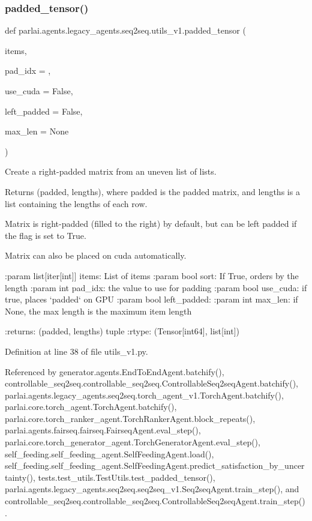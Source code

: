 \subsubsection{\texorpdfstring{padded\+\_\+tensor()}{padded\_tensor()}}
{\footnotesize\ttfamily def parlai.\+agents.\+legacy\+\_\+agents.\+seq2seq.\+utils\+\_\+v1.\+padded\+\_\+tensor (\begin{DoxyParamCaption}\item[{}]{items,  }\item[{}]{pad\+\_\+idx = {},  }\item[{}]{use\+\_\+cuda = {\ttfamily False},  }\item[{}]{left\+\_\+padded = {\ttfamily False},  }\item[{}]{max\+\_\+len = {\ttfamily None} }\end{DoxyParamCaption})}

\begin{DoxyVerb}Create a right-padded matrix from an uneven list of lists.

Returns (padded, lengths), where padded is the padded matrix, and lengths
is a list containing the lengths of each row.

Matrix is right-padded (filled to the right) by default, but can be
left padded if the flag is set to True.

Matrix can also be placed on cuda automatically.

:param list[iter[int]] items: List of items
:param bool sort: If True, orders by the length
:param int pad_idx: the value to use for padding
:param bool use_cuda: if true, places `padded` on GPU
:param bool left_padded:
:param int max_len: if None, the max length is the maximum item length

:returns: (padded, lengths) tuple
:rtype: (Tensor[int64], list[int])
\end{DoxyVerb}
 

Definition at line 38 of file utils\+\_\+v1.\+py.



Referenced by generator.\+agents.\+End\+To\+End\+Agent.\+batchify(), controllable\+\_\+seq2seq.\+controllable\+\_\+seq2seq.\+Controllable\+Seq2seq\+Agent.\+batchify(), parlai.\+agents.\+legacy\+\_\+agents.\+seq2seq.\+torch\+\_\+agent\+\_\+v1.\+Torch\+Agent.\+batchify(), parlai.\+core.\+torch\+\_\+agent.\+Torch\+Agent.\+batchify(), parlai.\+core.\+torch\+\_\+ranker\+\_\+agent.\+Torch\+Ranker\+Agent.\+block\+\_\+repeats(), parlai.\+agents.\+fairseq.\+fairseq.\+Fairseq\+Agent.\+eval\+\_\+step(), parlai.\+core.\+torch\+\_\+generator\+\_\+agent.\+Torch\+Generator\+Agent.\+eval\+\_\+step(), self\+\_\+feeding.\+self\+\_\+feeding\+\_\+agent.\+Self\+Feeding\+Agent.\+load(), self\+\_\+feeding.\+self\+\_\+feeding\+\_\+agent.\+Self\+Feeding\+Agent.\+predict\+\_\+satisfaction\+\_\+by\+\_\+uncertainty(), tests.\+test\+\_\+utils.\+Test\+Utils.\+test\+\_\+padded\+\_\+tensor(), parlai.\+agents.\+legacy\+\_\+agents.\+seq2seq.\+seq2seq\+\_\+v1.\+Seq2seq\+Agent.\+train\+\_\+step(), and controllable\+\_\+seq2seq.\+controllable\+\_\+seq2seq.\+Controllable\+Seq2seq\+Agent.\+train\+\_\+step().

